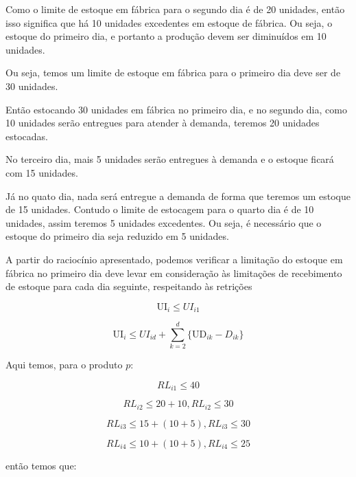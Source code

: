 \documentclass[authoryear,preprint,12pt]{elsarticle}
\begin{document}
Como o limite de estoque em fábrica para o segundo dia é de 20 unidades, então isso significa que há 10 unidades excedentes em estoque de fábrica. Ou seja, o estoque do primeiro dia, e portanto a produção devem ser diminuídos em 10 unidades.

Ou seja, temos um limite de estoque em fábrica para o primeiro dia deve ser de 30 unidades.

Então estocando 30 unidades em fábrica no primeiro dia, e no segundo dia, como 10 unidades serão entregues para atender à demanda, teremos 20 unidades estocadas.

No terceiro dia, mais 5 unidades serão entregues à demanda e o estoque ficará com 15 unidades.

Já no quato dia, nada será entregue a demanda de forma que teremos um estoque de 15 unidades. Contudo o limite de estocagem para o quarto dia é de 10 unidades, assim teremos 5 unidades excedentes. Ou seja, é necessário que o estoque do primeiro dia seja reduzido em 5 unidades. 

A partir do raciocínio apresentado, podemos verificar a limitação do estoque em fábrica no primeiro dia deve levar em consideração às limitações de recebimento de estoque para cada dia seguinte, respeitando às retrições

\begin{equation}
	\textrm{UI}_{i} \leq UI_{i1}
\end{equation}

\begin{equation}
	\textrm{UI}_{i} \leq UI_{id} + \sum_{k=2}^{d}\{\textrm{UD}_{ik} - D_{ik}\}
\end{equation}

Aqui temos, para o produto $p$:

\begin{equation}
	RL_{i1} \leq 40
\end{equation}

\begin{equation}
	RL_{i2} \leq 20 + 10 , RL_{i2} \leq 30
\end{equation}

\begin{equation}
	RL_{i3} \leq 15 + (10+5) , RL_{i3} \leq 30
\end{equation}

\begin{equation}
	RL_{i4} \leq 10 + (10+5) , RL_{i4} \leq 25
\end{equation}

então temos que:
\end{document}
